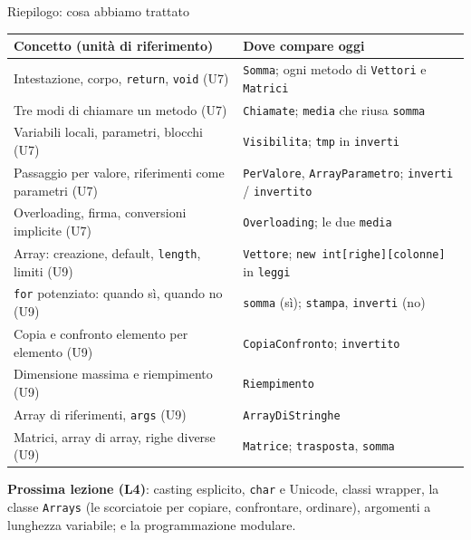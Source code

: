 \documentclass[10pt,aspectratio=169]{beamer}
\begin{document}
\begin{frame}{Riepilogo: cosa abbiamo trattato}
\footnotesize
\begin{center}
\renewcommand{\arraystretch}{1.25}
\begin{tabular}{|l|l|}
\hline
\textbf{Concetto (unità di riferimento)} & \textbf{Dove compare oggi} \\
\hline
Intestazione, corpo, \texttt{return}, \texttt{void} (U7) & \texttt{Somma}; ogni metodo di \texttt{Vettori} e \texttt{Matrici} \\
\hline
Tre modi di chiamare un metodo (U7) & \texttt{Chiamate}; \texttt{media} che riusa \texttt{somma} \\
\hline
Variabili locali, parametri, blocchi (U7) & \texttt{Visibilita}; \texttt{tmp} in \texttt{inverti} \\
\hline
Passaggio per valore, riferimenti come parametri (U7) & \texttt{PerValore}, \texttt{ArrayParametro}; \texttt{inverti} / \texttt{invertito} \\
\hline
Overloading, firma, conversioni implicite (U7) & \texttt{Overloading}; le due \texttt{media} \\
\hline
Array: creazione, default, \texttt{length}, limiti (U9) & \texttt{Vettore}; \texttt{new int[righe][colonne]} in \texttt{leggi} \\
\hline
\texttt{for} potenziato: quando sì, quando no (U9) & \texttt{somma} (sì); \texttt{stampa}, \texttt{inverti} (no) \\
\hline
Copia e confronto elemento per elemento (U9) & \texttt{CopiaConfronto}; \texttt{invertito} \\
\hline
Dimensione massima e riempimento (U9) & \texttt{Riempimento} \\
\hline
Array di riferimenti, \texttt{args} (U9) & \texttt{ArrayDiStringhe} \\
\hline
Matrici, array di array, righe diverse (U9) & \texttt{Matrice}; \texttt{trasposta}, \texttt{somma} \\
\hline
\end{tabular}
\end{center}

\vspace{0.2cm}
\textbf{Prossima lezione (L4)}: casting esplicito, \texttt{char} e Unicode, classi wrapper, la classe \texttt{Arrays} (le scorciatoie per copiare, confrontare, ordinare), argomenti a lunghezza variabile; e la programmazione modulare.
\end{frame}
\end{document}
